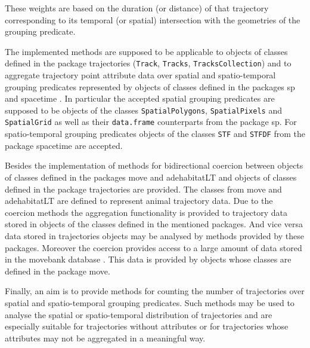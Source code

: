 \documentclass[12pt, oneside, a4paper]{scrbook}
\newcommand{\pkg}[1]{{\normalfont\fontseries{b}\selectfont #1}}
\let\code=\texttt
\begin{document}
These weights are based on the duration (or distance) of that trajectory corresponding to its temporal (or spatial) intersection with the geometries of the grouping predicate.
\par\medskip

The implemented methods are supposed to be applicable to objects of classes defined in the package \pkg{trajectories} (\code{Track}, \code{Tracks}, \code{TracksCollection}) and to aggregate trajectory point attribute data over spatial and spatio-temporal grouping predicates represented by objects of classes defined in the packages \pkg{sp} \citep{pebesma_sp:_2014} and \pkg{spacetime} \citep{pebesma_spacetime:_2012}.
In particular the accepted spatial grouping predicates are supposed to be objects of the classes \code{SpatialPolygons}, \code{SpatialPixels} and \code{SpatialGrid} as well as their \code{data.frame} counterparts from the package \pkg{sp}.
For spatio-temporal grouping predicates objects of the classes \code{STF} and \code{STFDF} from the package \pkg{spacetime} are accepted.
\par\medskip

Besides the implementation of methods for bidirectional coercion between objects of classes defined in the packages \pkg{move} \citep{kranstauber_move:_2014} and \pkg{adehabitatLT} \citep{calenge_adehabitatlt:_2014} and objects of classes defined in the package \pkg{trajectories} are provided.
The classes from \pkg{move} and \pkg{adehabitatLT} are defined to represent animal trajectory data.
Due to the coercion methods the aggregation functionality is provided to trajectory data stored in objects of the classes defined in the mentioned packages. And vice versa data stored in \pkg{trajectories} objects may be analysed by methods provided by these packages.  Moreover the coercion provides access to a large amount of data stored in the movebank database \citep{wikelski_movebank:_2011}. This data is provided by objects whose classes are defined in the package \pkg{move}.
\par\medskip

Finally, an aim is to provide methods for counting the number of trajectories over spatial and spatio-temporal grouping predicates. Such methods may be used to analyse the spatial or spatio-temporal distribution of trajectories and are especially suitable for trajectories without attributes or for trajectories whose attributes may not be aggregated in a meaningful way.
\par\medskip
\end{document}
